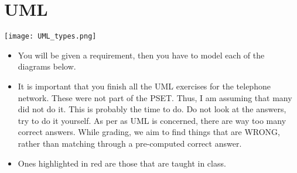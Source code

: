\documentclass[a4paper]{article}
\begin{document}
\section{UML}
\begin{center}
	\texttt{[image: UML\_types.png]}
\end{center}
\begin{framed}
	\begin{displayquote}
		\begin{itemize}
			\item You will be given a requirement, then you have to model each of the diagrams below.
			\item It is important that you finish all the UML exercises for the telephone network. These were not part of the PSET. Thus, I am assuming that many did not do it. This is probably the time to do. Do not look at the answers, try to do it yourself. As per as UML is concerned, there are way too many correct answers. While grading, we aim to find things that are WRONG, rather than matching through a pre-computed correct answer.
			\item Ones highlighted in red are those that are taught in class.
		\end{itemize}
	\end{displayquote}
\end{framed}
\end{document}
